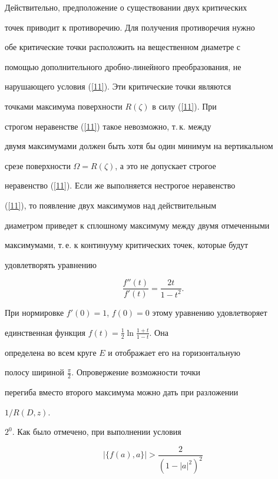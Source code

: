 Действительно, предположение о существовании двух критических


точек приводит к противоречию. Для получения противоречия нужно


обе критические точки расположить на вещественном диаметре с


помощью дополнительного дробно-линейного преобразования, не


нарушающего условия (\ref{11}). Эти критические точки являются


точками максимума поверхности $R(\zeta)$ в силу (\ref{11}). При


строгом неравенстве (\ref{11}) такое невозможно, т.\,к. между


двумя максимумами должен быть хотя бы один минимум на вертикальном


срезе поверхности $\Omega=R(\zeta)$, а это не допускает строгое


неравенство (\ref{11}). Если же выполняется нестрогое неравенство


(\ref{11}), то появление двух максимумов над действительным


диаметром приведет к сплошному максимуму между двумя отмеченными


максимумами, т.\,е. к континууму критических точек, которые будут


удовлетворять уравнению


$$


\frac{f''(t)}{f'(t)}=\frac{2{t}}{1-t^2}.


$$


При нормировке $f'(0)=1$, $f(0)=0$ этому уравнению удовлетворяет


единственная функция $f(t)=\frac12\ln\frac{1+t}{1-t}$. Она


определена во всем круге $E$ и отображает его на горизонтальную


полосу шириной $\frac{\pi}{2}$. Опровержение возможности точки


перегиба вместо второго максимума можно дать при разложении


$1/R({D},z)$.


\medskip





$2^0$. Как было отмечено, при выполнении условия


\begin{equation}\label{12}


|\{f(a),a\}|> \frac{2}{(1-|a|^2)^2}


\end{equation}


